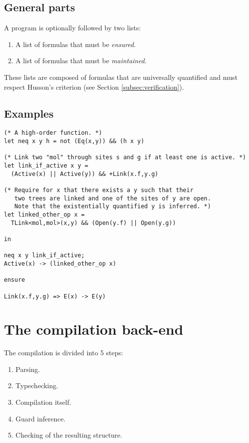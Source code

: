 \documentclass[10pt,a4paper]{article}
\begin{document}
\subsection{General parts}
A program is optionally followed by two lists:
\begin{enumerate}
\item A list of formulas that must be \emph{ensured}.
\item A list of formulas that must be \emph{maintained}.
\end{enumerate}

These lists are composed of formulas that are universally quantified and must respect Husson's criterion (see Section \ref{subsec:verification}).

\subsection{Examples}
\label{configex}
\begin{verbatim}
(* A high-order function. *)
let neq x y h = not (Eq(x,y)) && (h x y)

(* Link two "mol" through sites s and g if at least one is active. *)
let link_if_active x y =
  (Active(x) || Active(y)) && +Link(x.f,y.g)

(* Require for x that there exists a y such that their
   two trees are linked and one of the sites of y are open.
   Note that the existentially quantified y is inferred. *)
let linked_other_op x =
  TLink<mol,mol>(x,y) && (Open(y.f) || Open(y.g))

in

neq x y link_if_active;
Active(x) -> (linked_other_op x)

ensure

Link(x.f,y.g) => E(x) -> E(y)
\end{verbatim}


\section{The compilation back-end}
The compilation is divided into 5 steps:
\begin{enumerate}
\item Parsing.
\item Typechecking.
\item Compilation itself.
\item Guard inference.
\item Checking of the resulting structure.
\end{enumerate}
\end{document}
